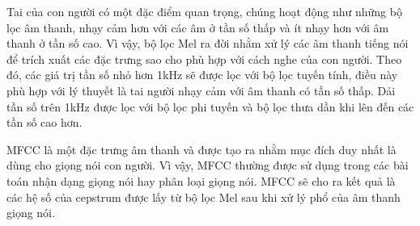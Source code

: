 Tai của con người có một đặc điểm quan trọng, chúng hoạt động như những bộ lọc âm thanh, nhạy cảm hơn với các âm ở tần số thấp và ít nhạy hơn với âm thanh ở tần số cao. Vì vậy, bộ lọc Mel ra đời nhằm xử lý các âm thanh tiếng nói để trích xuất các đặc trưng sao cho phù hợp với cách nghe của con người. Theo đó, các giá trị tần số nhỏ hơn 1kHz sẽ được lọc với bộ lọc tuyến tính, điều này phù hợp với lý thuyết là tai người nhạy cảm với âm thanh có tần số thấp. Dải tần số trên 1kHz được lọc với bộ lọc phi tuyến và bộ lọc thưa dần khi lên đến các tần số cao hơn.

MFCC là một đặc trưng âm thanh và được tạo ra nhằm mục đích duy nhất là dùng cho giọng nói con người. Vì vậy, MFCC thường được sử dụng trong các bài toán nhận dạng giọng nói hay phân loại giọng nói. MFCC sẽ cho ra kết quả là các hệ số của cepstrum được lấy từ bộ lọc Mel sau khi xử lý phổ của âm thanh giọng nói.
